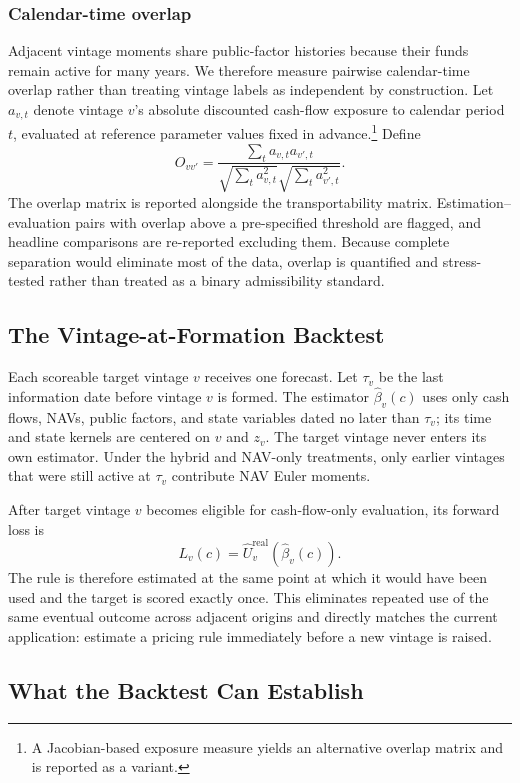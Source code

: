 \documentclass[11pt]{article}
\begin{document}
\subsubsection{Calendar-time overlap}

Adjacent vintage moments share public-factor histories because their funds
remain active for many years. We therefore measure pairwise calendar-time
overlap rather than treating vintage labels as independent by construction.
Let $a_{v,t}$ denote vintage $v$'s absolute discounted cash-flow exposure to
calendar period $t$, evaluated at reference parameter values fixed in
advance.\footnote{A Jacobian-based exposure measure yields an alternative
overlap matrix and is reported as a variant.} Define
\[
O_{vv'}
=
\frac{\sum_t a_{v,t}a_{v',t}}
{\sqrt{\sum_ta_{v,t}^2}\sqrt{\sum_ta_{v',t}^2}}.
\]
The overlap matrix is reported alongside the transportability matrix.
Estimation--evaluation pairs with overlap above a pre-specified threshold are
flagged, and headline comparisons are re-reported excluding them. Because
complete separation would eliminate most of the data, overlap is quantified
and stress-tested rather than treated as a binary admissibility standard.

\subsection{The Vintage-at-Formation Backtest}

Each scoreable target vintage $v$ receives one forecast. Let $\tau_v$ be the
last information date before vintage $v$ is formed. The estimator
$\widehat\beta_v(c)$ uses only cash flows, NAVs, public factors, and state
variables dated no later than $\tau_v$; its time and state kernels are centered
on $v$ and $z_v$. The target vintage never enters its own estimator. Under the
hybrid and NAV-only treatments, only earlier vintages that were still active
at $\tau_v$ contribute NAV Euler moments.

After target vintage $v$ becomes eligible for cash-flow-only evaluation, its
forward loss is
\[
L_v(c)
=
\widehat U_v^{\mathrm{real}}\!\left(\widehat\beta_v(c)\right).
\]
The rule is therefore estimated at the same point at which it would have been
used and the target is scored exactly once. This eliminates repeated use of
the same eventual outcome across adjacent origins and directly matches the
current application: estimate a pricing rule immediately before a new vintage
is raised.

\subsection{What the Backtest Can Establish}
\end{document}
